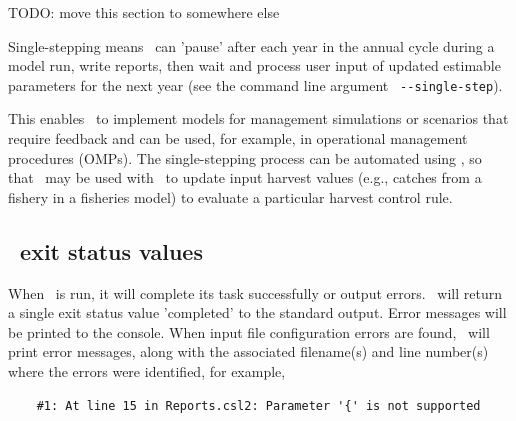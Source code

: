 TODO: move this section to somewhere else

Single-stepping means \CNAME~can 'pause' after each year in the annual cycle during a model run, write reports, then wait and process user input of updated estimable parameters for the next year (see the command line argument \texttt{ -{}-single-step}).

This enables \CNAME~to implement models for management simulations or scenarios that require feedback and can be used, for example, in operational management procedures (OMPs). The single-stepping process can be automated using \R, so that \CNAME~may be used with \R\ to update input harvest values (e.g., catches from a fishery in a fisheries model) to evaluate a particular harvest control rule.

\subsection{\CNAME~exit status values}

When \CNAME~is run, it will complete its task successfully or output errors. \CNAME~will return a single exit status value 'completed' to the standard output. Error messages will be printed to the console. When input file configuration errors are found, \CNAME~will print error messages, along with the associated filename(s) and line number(s) where the errors were identified, for example,

{\small{\begin{verbatim}
	#1: At line 15 in Reports.csl2: Parameter '{' is not supported
\end{verbatim}}}
